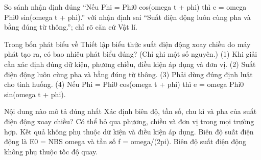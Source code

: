 \begin{bt}
So sánh nhận định đúng “Nếu Phi = Phi0 cos(omega t + phi) thì e = omega Phi0 sin(omega t + phi).” với nhận định sai “Suất điện động luôn cùng pha và bằng đúng từ thông.”; chỉ rõ căn cứ Vật lí.
\end{bt}

\begin{ex}
Trong bốn phát biểu về Thiết lập biểu thức suất điện động xoay chiều do máy phát tạo ra, có bao nhiêu phát biểu đúng? (Chỉ ghi một số nguyên.) (1) Khi giải cần xác định đúng dữ kiện, phương chiều, điều kiện áp dụng và đơn vị. (2) Suất điện động luôn cùng pha và bằng đúng từ thông. (3) Phải dùng đúng định luật cho tình huống. (4) Nếu Phi = Phi0 cos(omega t + phi) thì e = omega Phi0 sin(omega t + phi).
\end{ex}

\begin{ex}
Nội dung nào mô tả đúng nhất Xác định biên độ, tần số, chu kì và pha của suất điện động xoay chiều?
\choice
{Có thể bỏ qua phương, chiều và đơn vị trong mọi trường hợp.}
{Kết quả không phụ thuộc dữ kiện và điều kiện áp dụng.}
{\True Biên độ suất điện động là E0 = NBS omega và tần số f = omega/(2pi).}
{Biên độ suất điện động không phụ thuộc tốc độ quay.}
\end{ex}

